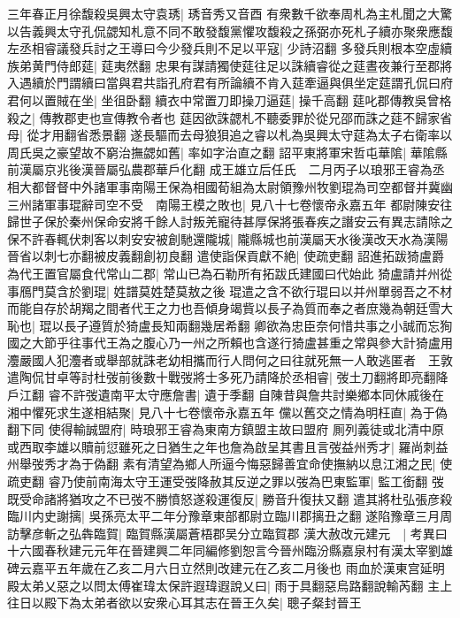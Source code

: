 三年春正月徐馥殺吳興太守袁琇|{
	琇音秀又音酉}
有衆數千欲奉周札為主札聞之大驚以告義興太守孔侃勰知札意不同不敢發馥黨懼攻馥殺之孫弼亦死札子續亦聚衆應馥左丞相睿議發兵討之王導曰今少發兵則不足以平寇|{
	少詩沼翻}
多發兵則根本空虛續族弟黄門侍郎莚|{
	莚夷然翻}
忠果有謀請獨使莚往足以誅續睿從之莚晝夜兼行至郡將入遇續於門謂續曰當與君共詣孔府君有所論續不肯入莚牽逼與俱坐定莚謂孔侃曰府君何以置賊在坐|{
	坐徂卧翻}
續衣中常置刀即操刀逼莚|{
	操千高翻}
莚叱郡傳教吳曾格殺之|{
	傳教郡吏也宣傳教令者也}
莚因欲誅勰札不聽委罪於從兄邵而誅之莚不歸家省母|{
	從才用翻省悉景翻}
遂長驅而去母狼狽追之睿以札為吳興太守莚為太子右衛率以周氏吳之豪望故不窮治撫勰如舊|{
	率如字治直之翻}
詔平東將軍宋哲屯華隂|{
	華隂縣前漢屬京兆後漢晉屬弘農郡華戶化翻}
成王雄立后任氏　二月丙子以琅邪王睿為丞相大都督督中外諸軍事南陽王保為相國荀組為太尉領豫州牧劉琨為司空都督并冀幽三州諸軍事琨辭司空不受　南陽王模之敗也|{
	見八十七卷懷帝永嘉五年}
都尉陳安往歸世子保於秦州保命安將千餘人討叛羌寵待甚厚保將張春疾之譖安云有異志請除之保不許春輒伏刺客以刺安安被創馳還隴城|{
	隴縣城也前漢屬天水後漢改天水為漢陽晉省以刺七亦翻被皮義翻創初良翻}
遣使詣保貢獻不絶|{
	使疏吏翻}
詔進拓跋猗盧爵為代王置官屬食代常山二郡|{
	常山已為石勒所有拓跋氏建國曰代始此}
猗盧請并州從事鴈門莫含於劉琨|{
	姓譜莫姓楚莫敖之後}
琨遣之含不欲行琨曰以并州單弱吾之不材而能自存於胡羯之間者代王之力也吾傾身竭貲以長子為質而奉之者庶幾為朝廷雪大恥也|{
	琨以長子遵質於猗盧長知兩翻幾居希翻}
卿欲為忠臣奈何惜共事之小誠而忘狥國之大節乎往事代王為之腹心乃一州之所賴也含遂行猗盧甚重之常與參大計猗盧用灋嚴國人犯灋者或舉部就誅老幼相攜而行人問何之曰往就死無一人敢逃匿者　王敦遣陶侃甘卓等討杜弢前後數十戰弢將士多死乃請降於丞相睿|{
	弢土刀翻將即亮翻降戶江翻}
睿不許弢遺南平太守應詹書|{
	遺于季翻}
自陳昔與詹共討樂鄉本同休戚後在湘中懼死求生遂相結聚|{
	見八十七卷懷帝永嘉五年}
儻以舊交之情為明枉直|{
	為于偽翻下同}
使得輸誠盟府|{
	時琅邪王睿為東南方鎮盟主故曰盟府}
厠列義徒或北清中原或西取李雄以贖前愆雖死之日猶生之年也詹為啟呈其書且言弢益州秀才|{
	羅尚刺益州舉弢秀才為于偽翻}
素有清望為鄉人所逼今悔惡歸善宜命使撫納以息江湘之民|{
	使疏吏翻}
睿乃使前南海太守王運受弢降赦其反逆之罪以弢為巴東監軍|{
	監工銜翻}
弢既受命諸將猶攻之不已弢不勝憤怒遂殺運復反|{
	勝音升復扶又翻}
遣其將杜弘張彦殺臨川内史謝摛|{
	吳孫亮太平二年分豫章東部都尉立臨川郡摛丑之翻}
遂陷豫章三月周訪擊彦斬之弘犇臨賀|{
	臨賀縣漢屬蒼梧郡吴分立臨賀郡}
漢大赦改元建元　|{
	考異曰十六國春秋建元元年在晉建興二年同編修劉恕言今晉州臨汾縣嘉泉村有漢太宰劉雄碑云嘉平五年歲在乙亥二月六日立然則改建元在乙亥二月後也}
雨血於漢東宫延明殿太弟乂惡之以問太傅崔瑋太保許遐瑋遐說乂曰|{
	雨于具翻惡烏路翻說輸芮翻}
主上往日以殿下為太弟者欲以安衆心耳其志在晉王久矣|{
	聰子粲封晉王}
